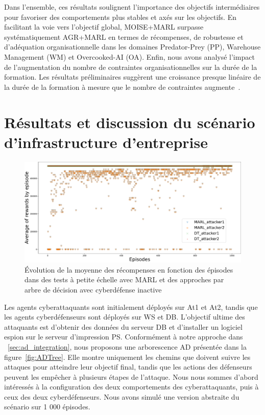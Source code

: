 Dans l'ensemble, ces résultats soulignent l'importance des objectifs intermédiaires pour favoriser des comportements plus stables et axés sur les objectifs. En facilitant la voie vers l'objectif global, MOISE+MARL surpasse systématiquement AGR+MARL en termes de récompenses, de robustesse et d'adéquation organisationnelle dans les domaines Predator-Prey (PP), Warehouse Management (WM) et Overcooked-AI (OA).
Enfin, nous avons analysé l'impact de l'augmentation du nombre de contraintes organisationnelles sur la durée de la formation. Les résultats préliminaires suggèrent une croissance presque linéaire de la durée de la formation à mesure que le nombre de contraintes augmente~\footnotemark[1].

\section{Résultats et discussion du scénario d'infrastructure d'entreprise}\label{sec:results_and_discussion_infra}

\begin{figure}
  \centering
  \includegraphics[width=\linewidth]{figures/graphs.pdf}
  \caption{Évolution de la moyenne des récompenses en fonction des épisodes dans des tests à petite échelle avec MARL et des approches par arbre de décision avec cyberdéfense inactive
  }
  \label{fig:graphs}
\end{figure}

\noindent
Les agents cyberattaquants sont initialement déployés sur At1 et At2, tandis que les agents cyberdéfenseurs sont déployés sur WS et DB. L'objectif ultime des attaquants est d'obtenir des données du serveur DB et d'installer un logiciel espion sur le serveur d'impression PS. Conformément à notre approche dans ~\ref{sec:ad_integration}, nous proposons une arborescence AD présentée dans la figure~\ref{fig:ADTree}. Elle montre uniquement les chemins que doivent suivre les attaques pour atteindre leur objectif final, tandis que les actions des défenseurs peuvent les empêcher à plusieurs étapes de l'attaque.
Nous nous sommes d'abord intéressés à la configuration des deux comportements des cyberattaquants, puis à ceux des deux cyberdéfenseurs. Nous avons simulé une version abstraite du scénario sur 1 000 épisodes.

